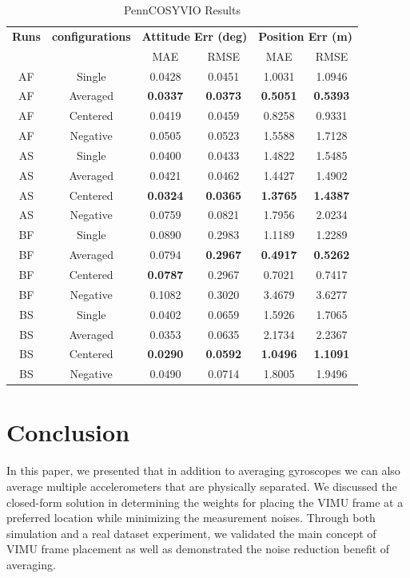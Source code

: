\documentclass[conference]{IEEEtran}
\begin{document}
\begin{table}[h!]
\centering
\caption{PennCOSYVIO Results}
\label{tab:vio_result}
\begin{tabular}{cccccc}
\toprule
\textbf{Runs} & \textbf{configurations} & \multicolumn{2}{c}{\textbf{Attitude Err (deg)}} & \multicolumn{2}{c}{\textbf{Position Err (m)}} \\
\cmidrule(lr){3-4} \cmidrule(lr){5-6}
 & & MAE & RMSE & MAE & RMSE \\
\midrule
AF & Single    & 0.0428 & 0.0451 & 1.0031 & 1.0946 \\
AF & Averaged  & \textbf{0.0337} & \textbf{0.0373} & \textbf{0.5051} & \textbf{0.5393} \\
AF & Centered  & 0.0419 & 0.0459 & 0.8258 & 0.9331 \\
AF & Negative  & 0.0505 & 0.0523 & 1.5588 & 1.7128 \\
\midrule
AS & Single    & 0.0400 & 0.0433 & 1.4822 & 1.5485 \\
AS & Averaged  & 0.0421 & 0.0462 & 1.4427 & 1.4902 \\
AS & Centered  & \textbf{0.0324} & \textbf{0.0365} & \textbf{1.3765} & \textbf{1.4387} \\
AS & Negative  & 0.0759 & 0.0821 & 1.7956 & 2.0234 \\
\midrule
BF & Single    & 0.0890 & 0.2983 & 1.1189 & 1.2289 \\
BF & Averaged  & 0.0794 & \textbf{0.2967} & \textbf{0.4917} & \textbf{0.5262} \\
BF & Centered  & \textbf{0.0787} & 0.2967 & 0.7021 & 0.7417 \\
BF & Negative  & 0.1082 & 0.3020 & 3.4679 & 3.6277 \\
\midrule
BS & Single    & 0.0402 & 0.0659 & 1.5926 & 1.7065 \\
BS & Averaged  & 0.0353 & 0.0635 & 2.1734 & 2.2367 \\
BS & Centered  & \textbf{0.0290} & \textbf{0.0592} & \textbf{1.0496} & \textbf{1.1091} \\
BS & Negative  & 0.0490 & 0.0714 & 1.8005 & 1.9496 \\
\bottomrule
\end{tabular}
\end{table}

\section{Conclusion}

In this paper, we presented that in addition to averaging gyroscopes we can also average multiple accelerometers that are physically separated. We discussed the closed-form solution in determining the weights for placing the VIMU frame at a preferred location while minimizing the measurement noises. Through both simulation and a real dataset experiment, we validated the main concept of VIMU frame placement as well as demonstrated the noise reduction benefit of averaging.
\end{document}
